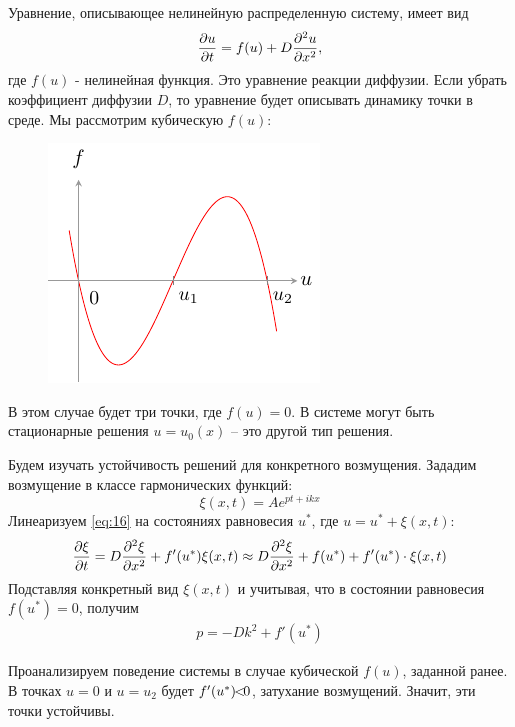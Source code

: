 Уравнение, описывающее нелинейную распределенную систему, имеет вид
\begin{equation}
	\pdv{u}{t}=f\qty(u)+D\pdv[2]{u}{x},
	\label{eq:15}
\end{equation}
где $f(u)$ - нелинейная функция. Это уравнение реакции диффузии. Если убрать коэффициент диффузии $D$, то уравнение будет описывать динамику точки в среде. Мы рассмотрим  кубическую $f(u)$:
\begin{figure}[H]
	\centering
	\includegraphics[scale=1.5]{img/osci_and_wave_in_ordered_struct/cub}
\end{figure}
В этом случае будет три точки, где $f(u)=0$. В системе могут быть стационарные решения $u=u_0(x)$ -- это другой тип решения. 

Будем изучать устойчивость решений для конкретного возмущения. Зададим возмущение в классе гармонических функций: 
\begin{equation*}
	\xi(x,t) = A e^{pt+ikx}
\end{equation*}
Линеаризуем \eqref{eq:16} на состояниях равновесия $u^*$, где $u=u^*+\xi(x,t)$:
\begin{equation}
	\pdv{\xi}{t}=D\pdv[2]{\xi}{x}+f'(u^*)\xi(x,t)
	\approx D\pdv[2]{\xi}{x}+f(u^*)+f'(u^*)\cdot\xi(x,t)
	\label{eq:16}
\end{equation}
Подставляя конкретный вид $\xi(x,t)$ и учитывая, что в состоянии равновесия $f(u^*)=0$, получим
\begin{gather*}
	p =-Dk^2+f'(u^*)
\end{gather*}


Проанализируем поведение системы в случае кубической $f(u)$, заданной ранее. В точках  $u=0$ и $u=u_2$ будет $f'(u^*)\hspace{-4pt}<\hspace{-4pt}0$, затухание возмущений. Значит, эти точки устойчивы. 



